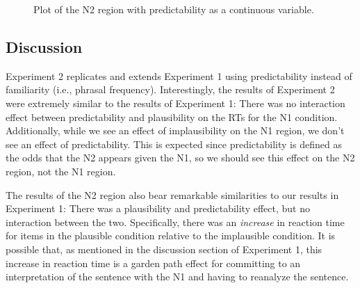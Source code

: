 \documentclass[
  12pt,
  letterpaper,
]{scrreprt}
\begin{document}
\begin{figure}[htbp]

\caption{\label{fig-N2LogOdds}Plot of the N2 region with predictability
as a continuous variable.}


\end{figure}%

\subsection{Discussion}\label{discussion-1}

Experiment 2 replicates and extends Experiment 1 using predictability
instead of familiarity (i.e., phrasal frequency). Interestingly, the
results of Experiment 2 were extremely similar to the results of
Experiment 1: There was no interaction effect between predictability and
plausibility on the RTs for the N1 condition. Additionally, while we see
an effect of implausibility on the N1 region, we don't see an effect of
predictability. This is expected since predictability is defined as the
odds that the N2 appears given the N1, so we should see this effect on
the N2 region, not the N1 region.

The results of the N2 region also bear remarkable similarities to our
results in Experiment 1: There was a plausibility and predictability
effect, but no interaction between the two. Specifically, there was an
\emph{increase} in reaction time for items in the plausible condition
relative to the implausible condition. It is possible that, as mentioned
in the discussion section of Experiment 1, this increase in reaction
time is a garden path effect for committing to an interpretation of the
sentence with the N1 and having to reanalyze the sentence.
\end{document}
